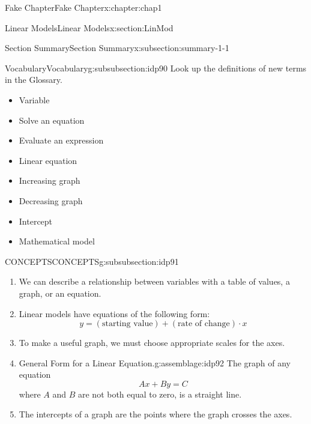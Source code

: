\documentclass[oneside,10pt,]{book}
\numberwithin{equation}{section}
\begin{document}
\begin{chapterptx}{Fake Chapter}{}{Fake Chapter}{}{}{x:chapter:chap1}
\begin{sectionptx}{Linear Models}{}{Linear Models}{}{}{x:section:LinMod}
\begin{subsectionptx}{Section Summary}{}{Section Summary}{}{}{x:subsection:summary-1-1}
%
%
\typeout{************************************************}
\typeout{************************************************}
%
\begin{subsubsectionptx}{Vocabulary}{}{Vocabulary}{}{}{g:subsubsection:idp90}
Look up the definitions of new terms in the Glossary.%
\begin{multicols}{3}
\begin{itemize}[label=\textbullet]
\item{}Variable%
\item{}Solve an equation%
\item{}Evaluate an expression%
\item{}Linear equation%
\item{}Increasing graph%
\item{}Decreasing graph%
\item{}Intercept%
\item{}Mathematical model%
\end{itemize}
\end{multicols}
%
\end{subsubsectionptx}
%
%
\typeout{************************************************}
\typeout{************************************************}
%
\begin{subsubsectionptx}{CONCEPTS}{}{CONCEPTS}{}{}{g:subsubsection:idp91}
%
\begin{enumerate}[label=\arabic*]
\item{}We can describe a relationship between variables with a table of values, a graph, or an equation.%
\item{}Linear models have equations of the following form:%
\begin{equation*}
y = (\text{starting value}) + (\text{rate of change})\cdot x
\end{equation*}
%
\item{}To make a useful graph, we must choose appropriate scales for the axes.%
\item{}\begin{assemblage}{General Form for a Linear Equation.}{g:assemblage:idp92}%
The graph of any equation%
\begin{equation*}
Ax+By=C
\end{equation*}
where \(A\) and \(B\) are not both equal to zero, is a straight line.%
\end{assemblage}
%
\item{}The intercepts of a graph are the points where the graph crosses the axes.%

\end{enumerate}
\end{subsubsectionptx}
\end{subsectionptx}
\end{sectionptx}
\end{chapterptx}
\end{document}
